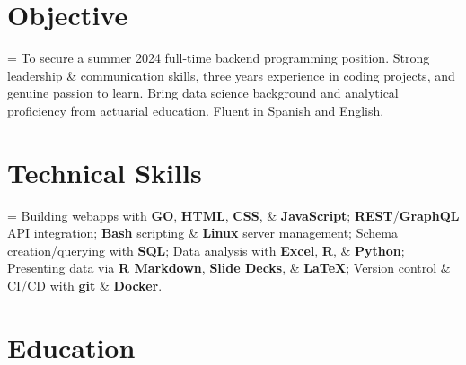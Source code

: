 \documentclass[12pt]{article}
\newcommand{\itemspace}{\vspace{0.3170em}}
\renewcommand{\textsc}[1]{\uppercase{\footnotesize#1}\normalsize}
\begin{document}
\maketitle

\vspace{-2.8mm}
\noindent\hrulefill

\vspace{-4.5mm}
\noindent\hrulefill

\itemspace
\section{Objective}

\hangindent=\parindent %
To secure a summer 2024 full-time backend programming position.
Strong leadership \& communication skills, three years experience in coding
projects, and genuine passion to learn. Bring data science background and analytical
proficiency from actuarial education. Fluent in Spanish and English.

\itemspace

\section{Technical Skills}

\hangindent=\parindent %
Building webapps with \textbf{\textsc{go}}, \textbf{\textsc{html}}, \textbf{\textsc{css}},
  \& \textbf{JavaScript};
\textbf{REST}/\textbf{GraphQL} API integration;
\textbf{Bash} scripting \& \textbf{Linux} server management;
Schema creation/querying with \textbf{\textsc{sql}};
Data analysis with \textbf{Excel}, \textbf{\textsc{r}}, \& \textbf{Python};
Presenting data via \textbf{R Markdown}, \textbf{Slide Decks}, \& \textbf{\LaTeX{}};
Version control \& CI/CD with \textbf{git} \& \textbf{Docker}.

\itemspace

\section{Education}
\end{document}
